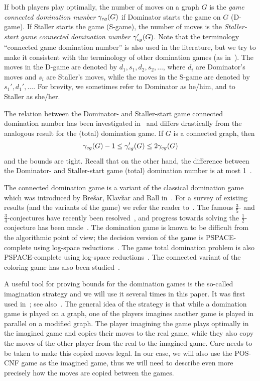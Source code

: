 \documentclass[12pt]{article}
\newcommand{\gcg}{\gamma_{\rm cg}}
\begin{document}
If both players play optimally, the number of moves on a graph $G$ is the \emph{game connected domination number} $\gcg(G)$ if Dominator starts the game on $G$ (D-game).  If Staller starts the game (S-game), the number of moves is the \emph{Staller-start game connected domination number} $\gcg'(G)$. Note that the terminology ``connected game domination number'' is also used in the literature, but we try to make it consistent with the terminology of other domination games (as in~\cite{bresar+2021book}). The moves in the D-game are denoted by $d_1, s_1, d_2, s_2, \ldots$, where $d_i$ are Dominator's moves and $s_i$ are Staller's moves, while the moves in the S-game are denoted by $s_1', d_1', \ldots$. For brevity, we sometimes refer to Dominator as he/him, and to Staller as she/her.

The relation between the Dominator- and Staller-start game connected domination number has been investigated in~\cite{borowiecki+2019connected, irsic2019+connected} and differs drastically from the analogous result for the (total) domination game. If $G$ is a connected graph, then $$\gcg(G) - 1 \leq \gcg'(G) \leq 2 \gcg(G)$$ and the bounds are tight. Recall that on the other hand, the difference between the Dominator- and Staller-start game (total) domination number is at most 1~\cite{bresar+2010original, henning+2015total, kinnersley+2013extremal}. 

The connected domination game is a variant of the classical domination game which was introduced by Brešar, Klavžar and Rall in~\cite{bresar+2010original}. For a survey of existing results (and the variants of the game) we refer the reader to~\cite{bresar+2021book}. The famous $\frac35$- and $\frac34$-conjectures have recently been resolved~\cite{portier-2022-3/4, versteegen-2023-3/5}, and progress towards solving the $\frac12$-conjecture has been made~\cite{portier-2024-1/2}. 
The domination game is known to be difficult from the algorithmic point of view; the decision version of the game is PSPACE-complete using log-space reductions~\cite{bresar+2016PSPACE2, klavzar+2015PSPACE1}. The game total domination problem is also PSPACE-complete using log-space reductions~\cite{bresar+2017pspace}. The connected variant of the coloring game has also been studied~\cite{charpentier+2020-con-col, lima+2023-con-col, bradshaw2023-con-col}.

A useful tool for proving bounds for the domination games is the so-called imagination strategy and we will use it several times in this paper. It was first used in~\cite{bresar+2010original}; see also~\cite[Section 2.2]{bresar+2021book}. The general idea of the strategy is that while a domination game is played on a graph, one of the players imagines another game is played in parallel on a modified graph. The player imagining the game plays optimally in the imagined game and copies their moves to the real game, while they also copy the moves of the other player from the real to the imagined game. Care needs to be taken to make this copied moves legal. In our case, we will also use the POS-CNF game as the imagined game, thus we will need to describe even more precisely how the moves are copied between the games.
\end{document}
